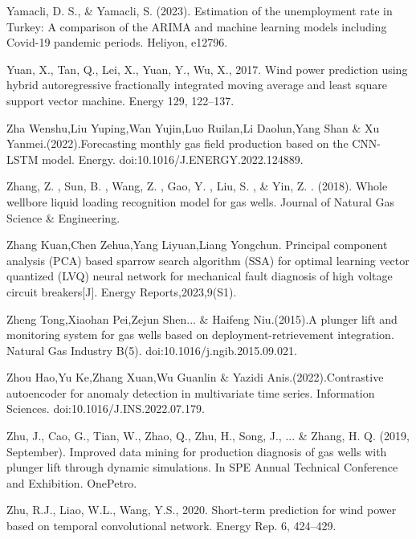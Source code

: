 \documentclass[sn-mathphys,Numbered]{sn-jnl}%
\theoremstyle{thmstyleone}%
\theoremstyle{thmstyletwo}%
\theoremstyle{thmstylethree}%
\begin{document}
Yamacli, D. S., \& Yamacli, S. (2023). Estimation of the unemployment rate in Turkey: A comparison of the ARIMA and machine learning models including Covid-19 pandemic periods. Heliyon, e12796.

Yuan, X., Tan, Q., Lei, X., Yuan, Y., Wu, X., 2017. Wind power prediction using hybrid autoregressive fractionally integrated moving average and least square support vector machine. Energy 129, 122–137.

Zha Wenshu,Liu Yuping,Wan Yujin,Luo Ruilan,Li Daolun,Yang Shan \& Xu Yanmei.(2022).Forecasting monthly gas field production based on the CNN-LSTM model. Energy. doi:10.1016/J.ENERGY.2022.124889.

Zhang, Z. ,  Sun, B. ,  Wang, Z. ,  Gao, Y. ,  Liu, S. , \&  Yin, Z. . (2018). Whole wellbore liquid loading recognition model for gas wells. Journal of Natural Gas Science \& Engineering.

Zhang Kuan,Chen Zehua,Yang Liyuan,Liang Yongchun. Principal component analysis (PCA) based sparrow search algorithm (SSA) for optimal learning vector quantized (LVQ) neural network for mechanical fault diagnosis of high voltage circuit breakers[J]. Energy Reports,2023,9(S1).

Zheng Tong,Xiaohan Pei,Zejun Shen... \& Haifeng Niu.(2015).A plunger lift and monitoring system for gas wells based on deployment-retrievement integration. Natural Gas Industry B(5). doi:10.1016/j.ngib.2015.09.021.

Zhou Hao,Yu Ke,Zhang Xuan,Wu Guanlin \& Yazidi Anis.(2022).Contrastive autoencoder for anomaly detection in multivariate time series. Information Sciences. doi:10.1016/J.INS.2022.07.179.

Zhu, J., Cao, G., Tian, W., Zhao, Q., Zhu, H., Song, J., ... \& Zhang, H. Q. (2019, September). Improved data mining for production diagnosis of gas wells with plunger lift through dynamic simulations. In SPE Annual Technical Conference and Exhibition. OnePetro.

Zhu, R.J., Liao, W.L., Wang, Y.S., 2020. Short-term prediction for wind power based on temporal convolutional network. Energy Rep. 6, 424–429.
\end{document}
